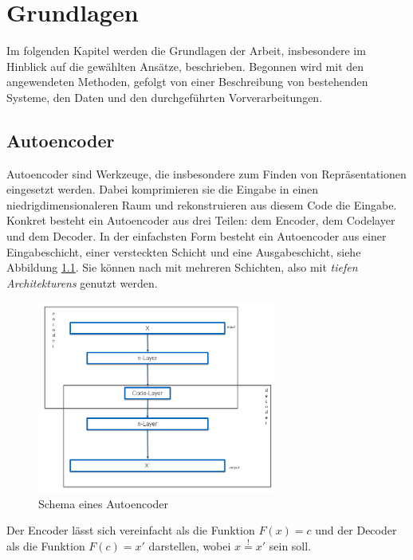\chapter{Grundlagen}
\label{chap:Grundlagen}
Im folgenden Kapitel werden die Grundlagen der Arbeit, insbesondere im Hinblick auf die gewählten Ansätze, beschrieben. Begonnen wird mit den angewendeten Methoden, gefolgt von einer Beschreibung von bestehenden Systeme, den Daten und den durchgeführten Vorverarbeitungen.

	\section{Autoencoder}
	\label{sec:ConvolutionalAutoencoder}		
	Autoencoder \cite{D.E.Rumelhart.1987} sind Werkzeuge, die insbesondere zum Finden von Repräsentationen eingesetzt werden. Dabei komprimieren sie die Eingabe in einen niedrigdimensionaleren Raum und rekonstruieren aus diesem Code die Eingabe. Konkret besteht ein Autoencoder aus drei Teilen: dem Encoder, dem Codelayer und dem Decoder. In der einfachsten Form besteht ein Autoencoder aus einer Eingabeschicht, einer versteckten Schicht und eine Ausgabeschicht, siehe Abbildung \ref{img:SchemaCAE}. Sie können nach \cite{Hinton.2006} mit mehreren Schichten, also mit \textit{tiefen Architekturens} genutzt werden. 
	\begin{figure}[h]
		\centering
		\includegraphics[width=0.7\textwidth, center]{bilder/Schema_Autoencoders/Schema_CAE2.png}
		\caption[Schema Autoencoder]{Schema eines Autoencoder}
		\label{img:SchemaCAE}
	\end{figure} 

	Der Encoder lässt sich vereinfacht als die Funktion $F(x)=c$ und der Decoder als die Funktion $ F(c)=x'$ darstellen, wobei $x\stackrel{!}{=}x'$ sein soll.
	 

